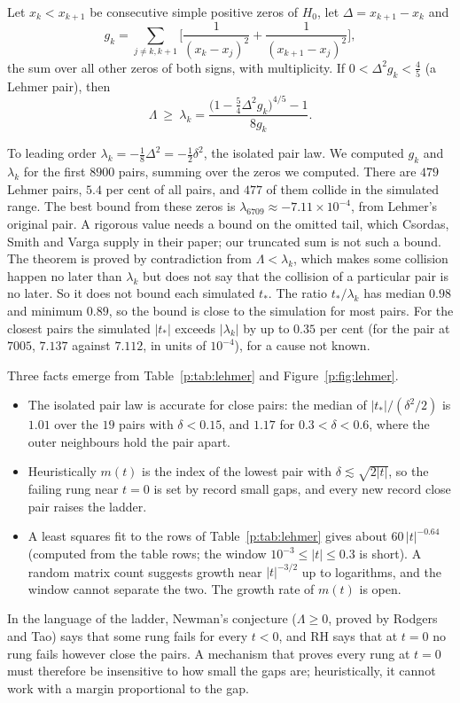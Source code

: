\begin{theorem}\label{p:thm:csv}
Let $x_k<x_{k+1}$ be consecutive simple positive zeros of $H_0$, let $\Delta=x_{k+1}-x_k$ and
\[
g_k=\sum_{j\ne k,k+1}\Big[\frac1{(x_k-x_j)^2}+\frac1{(x_{k+1}-x_j)^2}\Big],
\]
the sum over all other zeros of both signs, with multiplicity. If $0<\Delta^2g_k<\frac45$ (a Lehmer pair), then
\[
\Lambda\ \ge\ \lambda_k=\frac{\big(1-\frac54\Delta^2g_k\big)^{4/5}-1}{8g_k}.
\]
\end{theorem}

To leading order $\lambda_k=-\frac18\Delta^2=-\frac12\delta^2$, the isolated pair law. We computed $g_k$ and $\lambda_k$ for the first $8900$ pairs, summing over the zeros we computed. There are $479$ Lehmer pairs, $5.4$ per cent of all pairs, and $477$ of them collide in the simulated range. The best bound from these zeros is $\lambda_{6709}\approx-7.11\times10^{-4}$, from Lehmer's original pair. A rigorous value needs a bound on the omitted tail, which Csordas, Smith and Varga supply in their paper; our truncated sum is not such a bound. The theorem is proved by contradiction from $\Lambda<\lambda_k$, which makes some collision happen no later than $\lambda_k$ but does not say that the collision of a particular pair is no later. So it does not bound each simulated $t_*$. The ratio $t_*/\lambda_k$ has median $0.98$ and minimum $0.89$, so the bound is close to the simulation for most pairs. For the closest pairs the simulated $|t_*|$ exceeds $|\lambda_k|$ by up to $0.35$ per cent (for the pair at $7005$, $7.137$ against $7.112$, in units of $10^{-4}$), for a cause not known.

Three facts emerge from Table~\ref{p:tab:lehmer} and Figure~\ref{p:fig:lehmer}.
\begin{itemize}
\item The isolated pair law is accurate for close pairs: the median of $|t_*|/(\delta^2/2)$ is $1.01$ over the $19$ pairs with $\delta<0.15$, and $1.17$ for $0.3<\delta<0.6$, where the outer neighbours hold the pair apart.
\item Heuristically $m(t)$ is the index of the lowest pair with $\delta\lesssim\sqrt{2|t|}$, so the failing rung near $t=0$ is set by record small gaps, and every new record close pair raises the ladder.
\item A least squares fit to the rows of Table~\ref{p:tab:lehmer} gives about $60\,|t|^{-0.64}$ (computed from the table rows; the window $10^{-3}\le|t|\le0.3$ is short). A random matrix count suggests growth near $|t|^{-3/2}$ up to logarithms, and the window cannot separate the two. The growth rate of $m(t)$ is open.
\end{itemize}
In the language of the ladder, Newman's conjecture ($\Lambda\ge0$, proved by Rodgers and Tao) says that some rung fails for every $t<0$, and RH says that at $t=0$ no rung fails however close the pairs. A mechanism that proves every rung at $t=0$ must therefore be insensitive to how small the gaps are; heuristically, it cannot work with a margin proportional to the gap.

